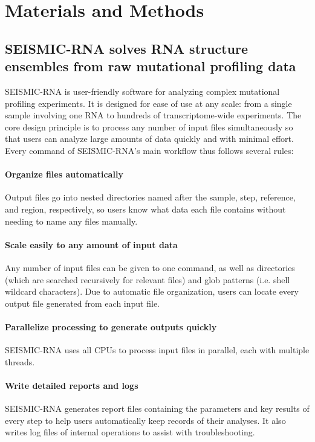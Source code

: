 \documentclass[11pt]{article}
\begin{document}
\section{Materials and Methods}\label{methods}

\subsection{SEISMIC-RNA solves RNA structure ensembles from raw mutational profiling data}

SEISMIC-RNA is user-friendly software for analyzing complex mutational profiling experiments.
It is designed for ease of use at any scale: from a single sample involving one RNA to hundreds of transcriptome-wide experiments.
The core design principle is to process any number of input files simultaneously so that users can analyze large amounts of data quickly and with minimal effort.
Every command of SEISMIC-RNA's main workflow thus follows several rules:

\paragraph{Organize files automatically}
Output files go into nested directories named after the sample, step, reference, and region, respectively, so users know what data each file contains without needing to name any files manually.
\paragraph{Scale easily to any amount of input data}
Any number of input files can be given to one command, as well as directories (which are searched recursively for relevant files) and glob patterns (i.e. shell wildcard characters). Due to automatic file organization, users can locate every output file generated from each input file.
\paragraph{Parallelize processing to generate outputs quickly}
SEISMIC-RNA uses all CPUs to process input files in parallel, each with multiple threads.
\paragraph{Write detailed reports and logs}
SEISMIC-RNA generates report files containing the parameters and key results of every step to help users automatically keep records of their analyses. It also writes log files of internal operations to assist with troubleshooting.
\end{document}
